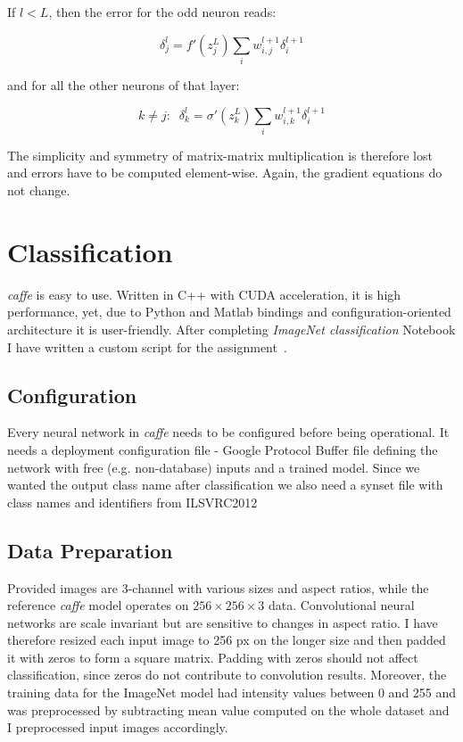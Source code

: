 \documentclass[journal, a4paper]{IEEEtran}
\begin{document}
    If $l < L$, then the error for the odd neuron reads:
    
    \begin{equation}
      \delta_j^l = f'(z_j^L) \sum_i w_{i, j}^{l+1} \delta_i^{l+1}
    \end{equation}
    
    and for all the other neurons of that layer:
    
    \begin{equation}
      k \neq j: \;\; \delta_k^l = \sigma'(z_k^L) \sum_i w_{i, k}^{l+1} \delta_i^{l+1}
    \end{equation}
    
    The simplicity and symmetry of matrix-matrix multiplication is therefore lost and errors have to be computed element-wise. Again, the gradient equations do not change.

    		
\section {Classification}
  \textit{caffe} is easy to use. Written in C++ with CUDA acceleration, it is high performance, yet, due to Python and Matlab bindings and configuration-oriented architecture it is user-friendly. After completing \textit{ImageNet classification} Notebook I have written a custom script for the assignment~\cite{code}.
  
  \subsection{Configuration}
    Every neural network in \textit{caffe} needs to be configured before being operational. It needs a deployment configuration file - Google Protocol Buffer file defining the network with free (e.g. non-database) inputs and a trained model. Since we wanted the output class name after classification we also need a synset file with class names and identifiers from ILSVRC2012 \cite{ImageNet}
   
  \subsection{Data Preparation}
    Provided images are 3-channel with various sizes and aspect ratios, while the reference \textit{caffe} model operates on $256\times 256\times 3$ data. Convolutional neural networks are scale invariant but are sensitive to changes in aspect ratio. I have therefore resized each input image to 256 px on the longer size and then padded it with zeros to form a square matrix. Padding with zeros should not affect classification, since zeros do not contribute to convolution results. Moreover, the training data for the ImageNet model had intensity values between 0 and 255 and was preprocessed by subtracting mean value computed on the whole dataset and I preprocessed input images accordingly.
    
\end{document}
